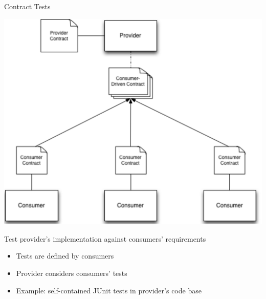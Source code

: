 \begin{frame}{Contract Tests}
\centerline{
		\includegraphics[height=0.47\textheight]{../TestStrategy/images/ConsumerContract}
}
\begin{block}{Test provider's implementation against consumers' requirements}
\vspace{-2mm}
\begin{itemize}
    \item Tests are defined by consumers
    \item Provider considers consumers' tests
    \item Example: self-contained JUnit tests in provider's code base
\end{itemize}
\vspace{-2mm}
\end{block}

\end{frame}


